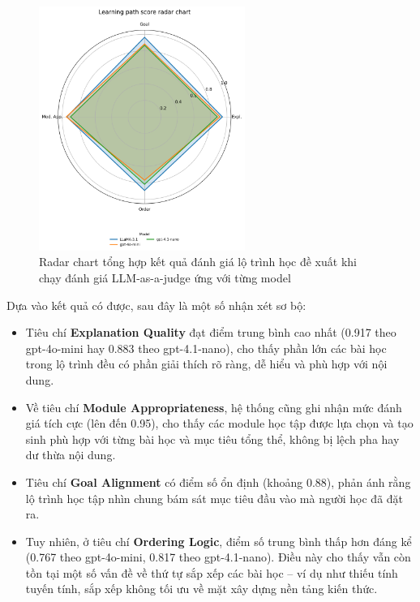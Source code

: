 \begin{figure}[H]
\centering
    \includegraphics[width=0.6\textwidth]{images/lp_eval_radar_chart.png}
    \caption{Radar chart tổng hợp kết quả đánh giá lộ trình học đề xuất khi chạy đánh giá LLM-as-a-judge ứng với từng model}
\end{figure}

Dựa vào kết quả có được, sau đây là một số nhận xét sơ bộ:
\begin{itemize}
    \item Tiêu chí \textbf{Explanation Quality} đạt điểm trung bình cao nhất (0.917 theo gpt-4o-mini hay 0.883 theo gpt-4.1-nano), cho thấy phần lớn các bài học trong lộ trình đều có phần giải thích rõ ràng, dễ hiểu và phù hợp với nội dung.

    \item Về tiêu chí \textbf{Module Appropriateness}, hệ thống cũng ghi nhận mức đánh giá tích cực (lên đến 0.95), cho thấy các module học tập được lựa chọn và tạo sinh phù hợp với từng bài học và mục tiêu tổng thể, không bị lệch pha hay dư thừa nội dung.

    \item Tiêu chí \textbf{Goal Alignment} có điểm số ổn định (khoảng 0.88), phản ánh rằng lộ trình học tập nhìn chung bám sát mục tiêu đầu vào mà người học đã đặt ra.

    \item Tuy nhiên, ở tiêu chí \textbf{Ordering Logic}, điểm số trung bình thấp hơn đáng kể (0.767 theo gpt-4o-mini, 0.817 theo gpt-4.1-nano). Điều này cho thấy vẫn còn tồn tại một số vấn đề về thứ tự sắp xếp các bài học – ví dụ như thiếu tính tuyến tính, sắp xếp không tối ưu về mặt xây dựng nền tảng kiến thức.
\end{itemize}

